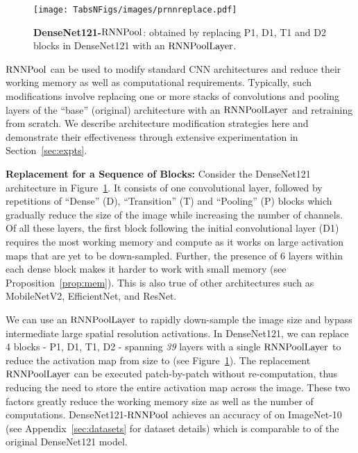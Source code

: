 \documentclass[10pt]{article}
\newcommand{\rpool}{\ensuremath{{\rm RNNPool}}\xspace}
\newcommand{\rpoollayer}{\ensuremath{{\rm RNNPoolLayer}}\xspace}
\newcommand{\alg}{\rpool}
\begin{document}
\begin{wrapfigure}{r}{0.48\columnwidth}
  \centering
  \vspace{-25pt}
    \texttt{[image: TabsNFigs/images/prnnreplace.pdf]}
\caption{\small \textbf{DenseNet121-\alg}: obtained by replacing P1,
  D1, T1 and D2 blocks in DenseNet121 with an \rpoollayer.}
\label{fig:DenseNet-PRNN}
\vspace{-12pt}
\end{wrapfigure}
 
\rpool can be used to modify standard CNN architectures and reduce
their working memory as well as computational requirements. Typically,
such modifications involve replacing one or more stacks of
convolutions and pooling layers of the ``base'' (original)
architecture with an \rpoollayer and retraining from scratch. We
describe architecture modification strategies here and demonstrate
their effectiveness through extensive experimentation in
Section~\ref{sec:expts}.

\textbf{Replacement for a Sequence of Blocks:} Consider the
DenseNet121~\citep{huang2017densely} architecture in
Figure~\ref{fig:DenseNet-PRNN}.  It consists of one convolutional
layer, followed by repetitions of ``Dense'' (D), ``Transition'' (T)
and ``Pooling'' (P) blocks which gradually reduce the size of the
image while increasing the number of channels.  Of all these layers,
the first block following the initial convolutional layer (D1)
requires the most working memory and compute as it works on large
activation maps that are yet to be down-sampled.  Further, the
presence of 6 layers within each dense block makes it harder to work
with small memory (see Proposition~\ref{prop:mem}).  This is also true
of other architectures such as MobileNetV2, EfficientNet, and ResNet.

We can use an \rpoollayer to rapidly down-sample the image size and
bypass intermediate large spatial resolution activations. In
DenseNet121, we can replace 4 blocks - P1, D1, T1, D2 - spanning
\emph{39} layers with a single \rpoollayer to reduce the activation
map from size  to  (see
Figure~\ref{fig:DenseNet-PRNN}). The replacement \rpoollayer can be
executed patch-by-patch without re-computation, thus reducing the need
to store the entire activation map across the image.  These two
factors greatly reduce the working memory size as well as the number
of computations. DenseNet121-\rpool achieves an accuracy of 
on ImageNet-10 (see Appendix~\ref{sec:datasets} for dataset details)
which is comparable to  of the original DenseNet121 model.
\end{document}
